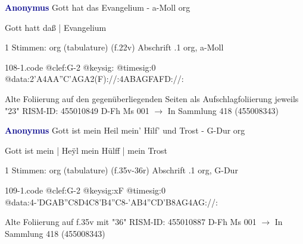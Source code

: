 \documentclass[twocolumn]{book}
\begin{document}
\newline \par \vspace{7pt} \textcolor{darkblue}{\textbf{Anonymus  }}
\newline Gott hat das Evangelium - a-Moll
\newline org
\newline \begin{itshape}[f.22v, at left:] Gott hatt daß | Evangelium\end{itshape} 
\newline \textcolor{darkblue}{}  1 Stimmen: org (tabulature)  (f.22v)
\newline Abschrift
.1  org, a-Moll  
\begin{filecontents*}{108-1.code}
@clef:G-2
@keysig:
@timesig:0
@data:2'A4AA''C'AGA2(F)://:4ABAGFAFD://:
\end{filecontents*}
\newline
%
\newline Alte Foliierung auf den gegenüberliegenden Seiten als Aufschlagfoliierung jeweils "23"
\newline RISM-ID: 455010849
\newline D-Fh  Ms 001
\newline $\rightarrow$ In Sammlung 418 (455008343)
      
\newline \par \vspace{7pt} \textcolor{darkblue}{\textbf{Anonymus  }}
\newline Gott ist mein Heil mein' Hilf' und Trost - G-Dur
\newline org
\newline \begin{itshape}[f.35v, at left:] Gott ist mein | Heÿl mein Hülff | mein Trost\end{itshape} 
\newline \textcolor{darkblue}{}  1 Stimmen: org (tabulature)  (f.35v-36r)
\newline Abschrift
.1  org, G-Dur  
\begin{filecontents*}{109-1.code}
@clef:G-2
@keysig:xF
@timesig:0
@data:4-'DGAB''C8D4C8'B4''C8-'AB4''CD'B{8AG}4AG://:
\end{filecontents*}
\newline
%
\newline Alte Foliierung auf f.35v mit "36"
\newline RISM-ID: 455010887
\newline D-Fh  Ms 001
\newline $\rightarrow$ In Sammlung 418 (455008343)
      
\end{document}
